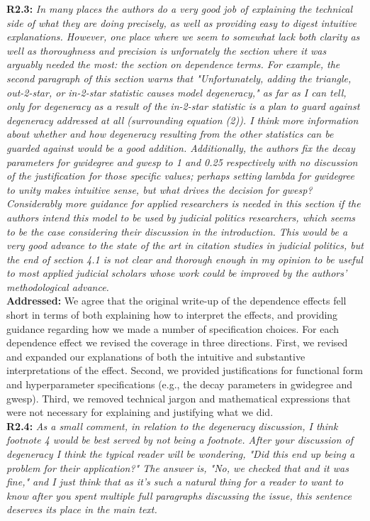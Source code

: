 \documentclass[a4paper,11pt]{texMemo}
\begin{document}
\noindent \textbf{R2.3:} \emph{ In many places the authors do a very good job of explaining the technical side of what they are doing precisely, as well as providing easy to digest intuitive explanations. However, one place where we seem to somewhat lack both clarity as well as thoroughness and precision is unfornately the section where it was arguably needed the most: the section on dependence terms. For example, the second paragraph of this section warns that "Unfortunately, adding the triangle, out-2-star, or in-2-star statistic causes model degeneracy," as far as I can tell, only for degeneracy as a result of the in-2-star statistic is a plan to guard against degeneracy addressed at all (surrounding equation (2)). I think more information about whether and how degeneracy resulting from the other statistics can be guarded against would be a good addition. Additionally, the authors fix the decay parameters for gwidegree and gwesp to 1 and 0.25 respectively with no discussion of the justification for those specific values; perhaps setting lambda for gwidegree to unity makes intuitive sense, but what drives the decision for gwesp? Considerably more guidance for applied researchers is needed in this section if the authors intend this model to be used by judicial politics researchers, which seems to be the case considering their discussion in the introduction. This would be a very good advance to the state of the art in citation studies in judicial politics, but the end of section 4.1 is not clear and thorough enough in my opinion to be useful to most applied judicial scholars whose work could be improved by the authors' methodological advance.}\\

\noindent \textbf{Addressed:}  We agree that the original write-up of the dependence effects fell short in terms of both explaining how to interpret the effects, and providing guidance regarding how we made a number of specification choices. For each dependence effect we revised the coverage in three directions. First, we revised and expanded our explanations of both the intuitive and substantive interpretations of the effect. Second, we provided justifications for functional form and hyperparameter specifications (e.g., the decay parameters in gwidegree and gwesp). Third, we removed technical jargon and mathematical expressions that were not necessary for explaining and justifying what we did.   \\

\noindent \textbf{R2.4:} \emph{ As a small comment, in relation to the degeneracy discussion, I think footnote 4 would be best served by not being a footnote. After your discussion of degeneracy I think the typical reader will be wondering, "Did this end up being a problem for their application?" The answer is, "No, we checked that and it was fine," and I just think that as it's such a natural thing for a reader to want to know after you spent multiple full paragraphs discussing the issue, this sentence deserves its place in the main text.}\\
\end{document}
